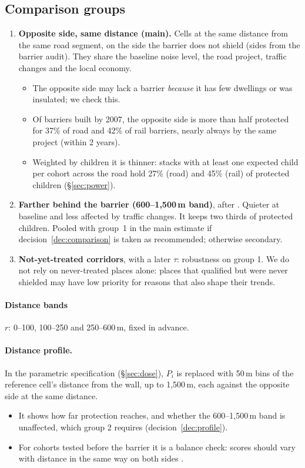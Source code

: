 \documentclass[11pt]{article}
\begin{document}
\subsection{Comparison groups}\label{sec:comparison}

\begin{enumerate}
\item \textbf{Opposite side, same distance (main).} Cells at the same distance from the same
  road segment, on the side the barrier does not shield (sides from the barrier audit). They
  share the baseline noise level, the road project, traffic changes and the local economy.
  \begin{itemize}
  \item The opposite side may lack a barrier \emph{because} it has few dwellings or was
    insulated; we check this.
  \item Of barriers built by 2007, the opposite side is more than half protected for 37\% of
    road and 42\% of rail barriers, nearly always by the same project (within 2 years).
  \item Weighted by children it is thinner: stacks with at least one
    expected child per cohort across the road hold 27\% (road) and 45\% (rail) of protected
    children (\S\ref{sec:power}).
  \end{itemize}
\item \textbf{Farther behind the barrier (600--1,500\,m band)}, after
  \textcite{morettiTrafficNoiseExternality2025}. Quieter at baseline and less affected by
  traffic changes. It keeps two thirds of protected children. Pooled with group~1 in the main
  estimate if decision~\ref{dec:comparison} is taken as recommended; otherwise secondary.
\item \textbf{Not-yet-treated corridors}, with a later \(\tau\): robustness on group 1. We do
  not rely on never-treated places alone: places that qualified but were never shielded may have
  low priority for reasons that also shape their trends.
\end{enumerate}

\paragraph{Distance bands} \(r\): 0--100, 100--250 and 250--600\,m, fixed in advance.

\paragraph{Distance profile.} In the parametric specification (\S\ref{sec:dose}), \(P_i\) is
replaced with 50\,m bins of the reference cell's distance from the wall, up to 1,500\,m, each
against the opposite side at the same distance.
\begin{itemize}
\item It shows how far protection reaches, and whether the 600--1,500\,m band is unaffected,
  which group 2 requires (decision~\ref{dec:profile}).
\item For cohorts tested before the barrier it is a balance check: scores should vary with
  distance in the same way on both sides \autocite[as in][]{berkhoutLeadExposureCognitive2025}.
\end{itemize}
\end{document}
